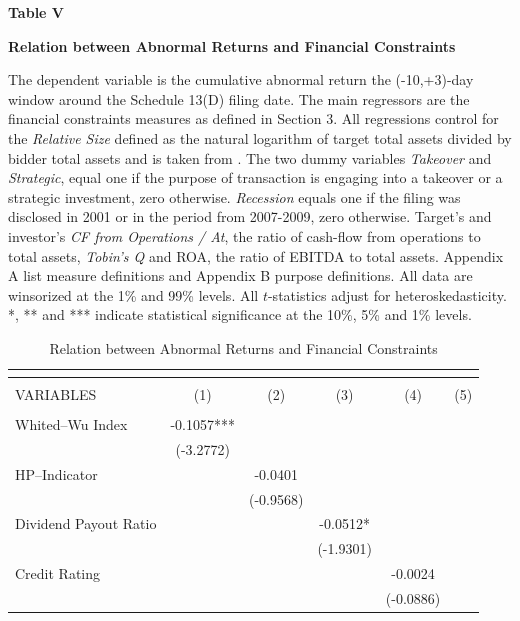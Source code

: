 \documentclass[12pt]{article}
\begin{document}
\begin{table}[!htbp]
	\centering
	\captionsetup{textformat=empty,labelformat=blank}
	\caption{Relation between Abnormal Returns and Financial Constraints}
	\textbf{Table V}\par\medskip
	\large\textbf{Relation between Abnormal Returns and Financial Constraints}\par\medskip
	\justifying
	\footnotesize\noindent{} The dependent variable is the cumulative abnormal return the (-10,+3)-day window around the Schedule 13(D) filing date. The main regressors are the financial constraints measures as defined in Section 3. All regressions control for the \emph{Relative Size} defined as the natural logarithm of target total assets divided by bidder total assets and is taken from \citet[p.112]{Khatami2014}. The two dummy variables \emph{Takeover} and \emph{Strategic}, equal one if the purpose of transaction is engaging into a takeover or a strategic investment, zero otherwise. \emph{Recession} equals one if the filing was disclosed in 2001 or in the period from 2007-2009, zero otherwise. Target's and investor's \emph{CF from Operations / At}, the ratio of cash-flow from operations to total assets, \emph{Tobin's Q} and ROA, the ratio of EBITDA to total assets. Appendix A list measure definitions and Appendix B purpose definitions. All data are winsorized at the 1\% and 99\% levels. All $t$-statistics adjust for heteroskedasticity. *, ** and *** indicate statistical significance at the 10\%, 5\% and 1\% levels.\par\medskip									
	\begin{adjustbox}{max width=\textwidth}
		\begin{tabular}{lccccc}
			\multicolumn{6}{c}{} \\ \hline
			\\
			VARIABLES & (1) &(2) & (3)& (4) & (5)\\ \hline
			 &  &  &  &  &  \\
			Whited--Wu Index & -0.1057*** &  &  &  &  \\
			 & (-3.2772) &  &  &  &  \\
			HP--Indicator &  & -0.0401 &  &  &  \\
			 &  & (-0.9568) &  &  &  \\
			Dividend Payout Ratio &  &  & -0.0512* &  &  \\
			 &  &  & (-1.9301) &  &  \\
			Credit Rating &  &  &  & -0.0024 &  \\
			 &  &  &  & (-0.0886) &  \\

\end{tabular}
\end{adjustbox}
\end{table}
\end{document}
